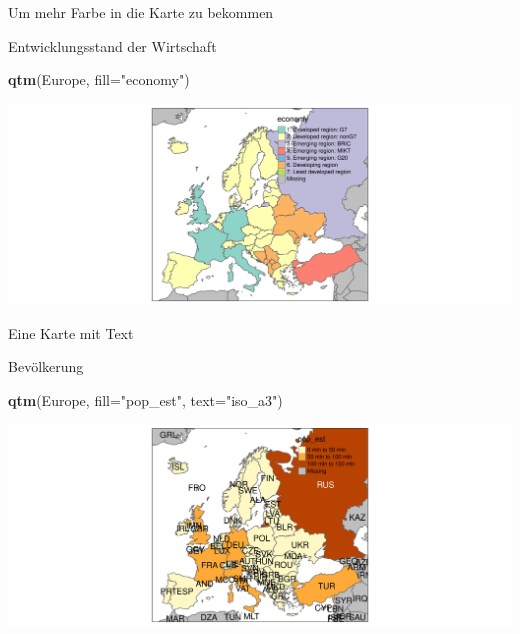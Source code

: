 \documentclass[ignorenonframetext,]{beamer}
\newenvironment{Shaded}{\begin{snugshade}}{\end{snugshade}}
\newcommand{\DataTypeTok}[1]{\textcolor[rgb]{0.13,0.29,0.53}{#1}}
\newcommand{\KeywordTok}[1]{\textcolor[rgb]{0.13,0.29,0.53}{\textbf{#1}}}
\newcommand{\NormalTok}[1]{#1}
\newcommand{\StringTok}[1]{\textcolor[rgb]{0.31,0.60,0.02}{#1}}
\begin{document}
\begin{frame}[fragile]{Um mehr Farbe in die Karte zu bekommen}
\protect\hypertarget{um-mehr-farbe-in-die-karte-zu-bekommen}{}

\begin{block}{Entwicklungsstand der Wirtschaft}

\begin{Shaded}
\begin{Highlighting}[]
\KeywordTok{qtm}\NormalTok{(Europe, }\DataTypeTok{fill=}\StringTok{"economy"}\NormalTok{)}
\end{Highlighting}
\end{Shaded}

\includegraphics{A4_tmap_files/figure-beamer/unnamed-chunk-9-1.pdf}

\end{block}

\end{frame}

\begin{frame}[fragile]{Eine Karte mit Text}
\protect\hypertarget{eine-karte-mit-text}{}

\begin{block}{Bevölkerung}

\begin{Shaded}
\begin{Highlighting}[]
\KeywordTok{qtm}\NormalTok{(Europe, }\DataTypeTok{fill=}\StringTok{"pop_est"}\NormalTok{, }\DataTypeTok{text=}\StringTok{"iso_a3"}\NormalTok{)}
\end{Highlighting}
\end{Shaded}

\includegraphics{A4_tmap_files/figure-beamer/unnamed-chunk-10-1.pdf}

\end{block}

\end{frame}
\end{document}
